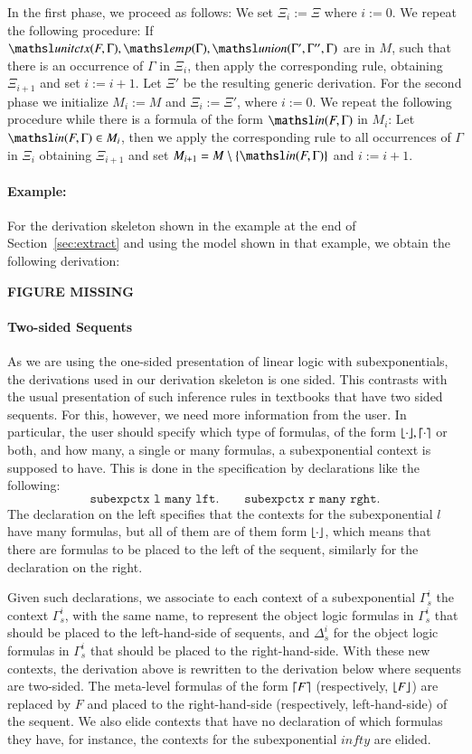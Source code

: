 \documentclass[a4paper,10pt]{article}
\newcommand{\elin}[2]{\ensuremath{{\tsl{unitctx}(\ensuremath{#1}, \ensuremath{#2})}}}
\newcommand{\emp}[1]{\ensuremath{{\tsl{emp}(\ensuremath{#1})}}}
\newcommand{\union}[3]{\ensuremath{{\tsl{union}(\ensuremath{#1},\ensuremath{#2},\ensuremath{ #3})}}}
\newcommand{\In}[2]{\ensuremath{\tsl{in}(\ensuremath{#1},\ensuremath{#2})}}
\begin{document}
In the first phase, we proceed as follows: We set $\Xi_i := \Xi$ where $ i := 0$.
We repeat the following procedure: If 
$\elin{F}{\Gamma}, \emp{\Gamma}, \union{\Gamma'}{\Gamma''}{\Gamma}$ are in $M$, such 
that there is an occurrence of $\Gamma$ in $\Xi_i$, then apply the corresponding 
rule, obtaining $\Xi_{i+1}$ and set $i := i + 1$. 
Let $\Xi'$ be the resulting generic derivation.
For the second phase we initialize $M_i := M$ and $\Xi_i := \Xi'$, where $i := 0$. We repeat 
the following procedure while there is a formula of the form $\In{F}{\Gamma}$ in $M_i$:
Let $\In{F}{\Gamma} \in M_i$, then we apply the corresponding rule to all occurrences of $\Gamma$ in $\Xi_i$
obtaining $\Xi_{i+1}$ and set $M_{i+1} = M \setminus \{\In{F}{\Gamma}\}$  and $i := i + 1$.

\paragraph{Example:}
For the derivation skeleton shown in the example at the end of 
Section~\ref{sec:extract} and using the model shown in that example, we obtain the following derivation:

\textbf{FIGURE MISSING}


\paragraph{Two-sided Sequents}
As we are using the one-sided presentation of linear logic with subexponentials, the derivations used 
in our derivation skeleton is one sided. This contrasts with the usual presentation of such inference
rules in textbooks that have two sided sequents. For this, however, we need more information from the 
user. In particular, the user should specify which type of formulas, of the form $\lfloor \cdot \rfloor, \lceil \cdot \rceil$ or both, 
and how many, a single or many formulas, a subexponential context is supposed to have. 
This is done in the specification by declarations like the following:
\[
 \texttt{subexpctx l many lft.} \qquad
 \texttt{subexpctx r many rght.}
\]
The declaration on the left specifies that the contexts for the subexponential
$l$ have many formulas, but all of them are of them form $\lfloor \cdot \rfloor$, which
means that there are formulas to be placed to the left of the sequent, similarly
for the declaration on the right.

Given such declarations, we associate to each context of a subexponential $\Gamma_s^i$ the context
$\Gamma_s^i$, with the same name, to represent the object logic formulas in $\Gamma_s^i$ that should be 
placed to the left-hand-side of sequents, and $\Delta_s^i$ for the object logic formulas in  $\Gamma_s^i$
that should be placed to the right-hand-side. With these new contexts, the derivation above is rewritten 
to the derivation below where sequents are two-sided. The meta-level formulas of the form $\lceil F \rceil$ (respectively, 
$\lfloor F \rfloor$) are replaced by $F$ and placed to the right-hand-side (respectively, left-hand-side) of the sequent. 
We also elide contexts that have no declaration of which formulas they have, for instance, the contexts for the 
subexponential $infty$ are elided.
\end{document}
